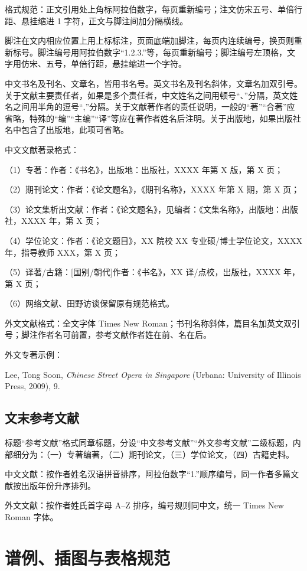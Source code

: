 格式规范：正文引用处上角标阿拉伯数字，每页重新编号；注文仿宋五号、单倍行距、悬挂缩进 1 字符，正文与脚注间加分隔横线。

脚注在文内相应位置上用上标标注，页面底端加脚注，每页内连续编号，换页则重新标号。脚注编号用阿拉伯数字“1.2.3.”等，每页重新编号；脚注编号左顶格，文字用仿宋、五号，单倍行距，悬挂缩进一个字符。

中文书名及刊名、文章名，皆用书名号。英文书名及刊名斜体，文章名加双引号。关于文献主要责任者，如果是多个责任者，中文姓名之间用顿号“、”分隔，英文姓名之间用半角的逗号“,”分隔。关于文献著作者的责任说明，一般的“著”“合著”应省略，特殊的“编”“主编”“译”等应在著作者姓名后注明。关于出版地，如果出版社名中包含了出版地，此项可省略。

中文文献著录格式：

（1）专著：作者：《书名》，出版地：出版社，XXXX 年第 X 版，第 X 页；

（2）期刊论文：作者：《论文题名》，《期刊名称》，XXXX 年第 X 期，第 X 页；

（3）论文集析出文献：作者：《论文题名》，见编者：《文集名称》，出版地：出版社，XXXX 年，第 X 页；

（4）学位论文：作者：《论文题目》，XX 院校 XX 专业硕/博士学位论文，XXXX 年，指导教师 XXX，第 X 页；

（5）译著/古籍：[国别/朝代]作者：《书名》，XX 译/点校，出版社，XXXX 年，第 X 页；

（6）网络文献、田野访谈保留原有规范格式。

外文文献格式：全文字体 Times New Roman；书刊名称斜体，篇目名加英文双引号；脚注作者名可前置，参考文献作者姓在前、名在后。

外文专著示例：

Lee, Tong Soon, \textit{Chinese Street Opera in Singapore} (Urbana: University of Illinois Press, 2009), 9.

\subsection{文末参考文献}

标题“参考文献”格式同章标题，分设“中文参考文献”“外文参考文献”二级标题，内部细分为：（一）专著编著，（二）期刊论文，（三）学位论文，（四）古籍史料。

中文文献：按作者姓名汉语拼音排序，阿拉伯数字“1.”顺序编号，同一作者多篇文献按出版年份升序排列。

外文文献：按作者姓氏首字母 A--Z 排序，编号规则同中文，统一 Times New Roman 字体。

\section{谱例、插图与表格规范}

